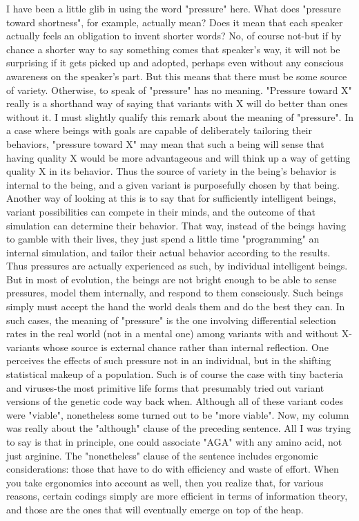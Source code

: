          I have been a little glib in using the word "pressure" here. What does "pressure
toward shortness", for example, actually mean? Does it mean that each speaker
actually feels an obligation to invent shorter words? No, of course not-but if by
chance a shorter way to say something comes that speaker's way, it will not be
surprising if it gets picked up and adopted, perhaps even without any conscious
awareness on the speaker's part. But this means that there must be some source of
variety. Otherwise, to speak of "pressure" has no meaning. "Pressure toward X" really
is a shorthand way of saying that variants with X will do better than ones without it.
         I must slightly qualify this remark about the meaning of "pressure". In a case
where beings with goals are capable of deliberately tailoring their behaviors,
"pressure toward X" may mean that such a being will sense that having quality X
would be more advantageous and will think up a way of getting quality X in its
behavior. Thus the source of variety in the being's behavior is internal to the being,
and a given variant is purposefully chosen by that being. Another way of looking at
this is to say that for sufficiently intelligent beings, variant possibilities can compete
in their minds, and the outcome of that simulation can determine their behavior. That
way, instead of the beings having to gamble with their lives, they just spend a little
time "programming" an internal simulation, and tailor their actual behavior according
to the results. Thus pressures are actually experienced as such, by individual
intelligent beings.
         But in most of evolution, the beings are not bright enough to be able to sense
pressures, model them internally, and respond to them consciously. Such beings
simply must accept the hand the world deals them and do the best they can. In such
cases, the meaning of "pressure" is the one involving differential selection rates in the
real world (not in a mental one) among variants with and without X-variants whose
source is external chance rather than internal reflection. One perceives the effects of
such pressure not in an individual, but in the shifting statistical makeup of a
population.
         Such is of course the case with tiny bacteria and viruses-the most primitive life
forms that presumably tried out variant versions of the genetic code way back when.
Although all of these variant codes were "viable", nonetheless some turned out to be
"more viable". Now, my column was really about the "although" clause of the
preceding sentence. All I was trying to say is that in principle, one could associate
"AGA" with any amino acid, not just arginine. The "nonetheless" clause of the
sentence includes ergonomic considerations: those that have to do with efficiency and
waste of effort. When you take ergonomics into account as well, then you realize that,
for various reasons, certain codings simply are more efficient in terms of information
theory, and those are the ones that will eventually emerge on top of the heap.

